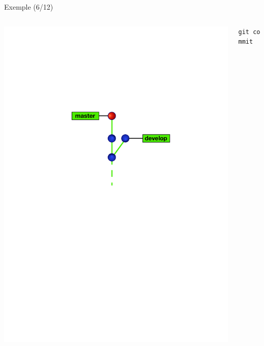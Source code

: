 \begin{frame}[fragile]{%
\protect\hypertarget{exemple-612}{%
Exemple (6/12)}}

\begin{columns}[T]
\begin{column}{0.40\textwidth}
\includegraphics[width=1\textwidth]{images/branch6.pdf}
\end{column}

\begin{column}{0.60\textwidth}
\texttt{git\ commit}
\end{column}
\end{columns}

\end{frame}

